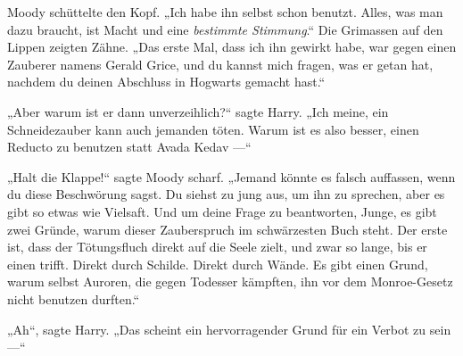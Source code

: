 Moody schüttelte den Kopf.
„Ich habe ihn selbst schon benutzt. Alles, was man dazu braucht, ist Macht und eine \emph{bestimmte Stimmung}.“ Die Grimassen auf den Lippen zeigten Zähne.
„Das erste Mal, dass ich ihn gewirkt habe, war gegen einen Zauberer namens Gerald Grice, und du kannst mich fragen, was er getan hat, nachdem du deinen Abschluss in Hogwarts gemacht hast.“

„Aber warum ist er dann unverzeihlich?“ sagte Harry.
„Ich meine, ein Schneidezauber kann auch jemanden töten. Warum ist es also besser, einen Reducto zu benutzen statt Avada Kedav —“

„Halt die Klappe!“ sagte Moody scharf.
„Jemand könnte es falsch auffassen, wenn du diese Beschwörung sagst. Du siehst zu jung aus, um ihn zu sprechen, aber es gibt so etwas wie Vielsaft. Und um deine Frage zu beantworten, Junge, es gibt zwei Gründe, warum dieser Zauberspruch im schwärzesten Buch steht. Der erste ist, dass der Tötungsfluch direkt auf die Seele zielt, und zwar so lange, bis er einen trifft. Direkt durch Schilde. Direkt durch Wände. Es gibt einen Grund, warum selbst Auroren, die gegen Todesser kämpften, ihn vor dem Monroe-Gesetz nicht benutzen durften.“

„Ah“, sagte Harry.
„Das scheint ein hervorragender Grund für ein Verbot zu sein —“

